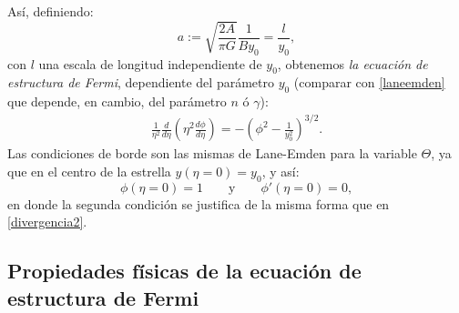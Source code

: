 Así, definiendo:
\begin{equation}\label{ec-fermi-a}
 a:=\sqrt{\frac{2A}{\pi G}}\frac{1}{B y_0}=\frac{l}{y_0},
\end{equation}
con $l$ una escala de longitud independiente de $y_0$, obtenemos \emph{la ecuación de estructura de Fermi}, dependiente del parámetro $y_0$ (comparar con \eqref{laneemden} que depende, en cambio, del parámetro $n$ ó $\gamma$):
\begin{align}\label{ec-fermi2}
\boxed{
\frac{1}{\eta^2}\frac{d}{d\eta}\left(\eta^2\frac{d\phi}{d\eta}\right)=-\left(\phi^2-\frac{1}{y_0^2}\right)^{3/2}.}
\end{align}
Las condiciones de borde son las mismas de Lane-Emden para la variable $\Theta$, ya que en el centro de la estrella $y(\eta=0)=y_0$, y así:
\begin{equation}\label{bcs-fermi}
\phi(\eta=0)=1\qquad\text{y}\qquad \phi'(\eta=0)=0,
\end{equation}
en donde la segunda condición se justifica de la misma forma que en \eqref{divergencia2}.

\subsection{Propiedades físicas de la ecuación de estructura de Fermi}

